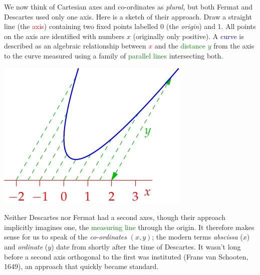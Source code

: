 \begin{minipage}[t]{0.64\linewidth}\vspace{0pt}
	We now think of Cartesian axes and co-ordinates as \emph{plural,} but both Fermat and Descartes used only one axis. Here is a sketch of their approach.
	\smallbreak
	Draw a straight line (the \textcolor{red}{axis}) containing two fixed points labelled 0 (the \emph{origin}) and 1. All points on the axis are identified with numbers $x$ (originally only positive).
	\smallbreak
	A \textcolor{blue}{curve} is described as an algebraic relationship between \textcolor{red}{$x$} and the \textcolor{Green}{distance $y$} from the axis to the curve measured using a family of \textcolor{Green}{parallel lines} intersecting both. 
\end{minipage}
\hfill
\begin{minipage}[t]{0.35\linewidth}\vspace{0pt}
	\flushright\includegraphics{analytic-parab}
\end{minipage}
\medbreak

Neither Descartes nor Fermat had a second axes, though their approach implicitly imagines one, the \textcolor{Green}{measuring line} through the origin. It therefore makes sense for us to speak of the \emph{co-ordinates} $(x,y)$; the modern terms \emph{abscissa} ($x$) and \emph{ordinate} ($y$) date from shortly after the time of Descartes. It wasn't long before a second axis orthogonal to the first was instituted (Frans van Schooten, 1649), an approach that quickly became standard.
\goodbreak


